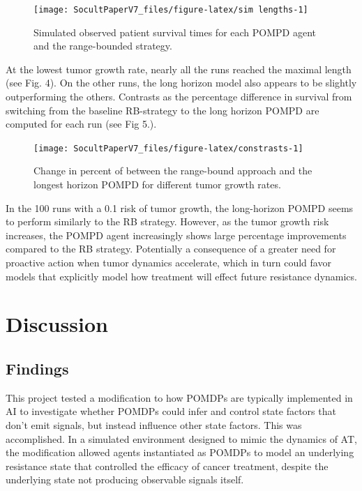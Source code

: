 \documentclass[
]{article}
\begin{document}
\begin{figure}

{\centering \texttt{[image: SocultPaperV7\_files/figure-latex/sim lengths-1]} 

}

\caption{Simulated observed patient survival times for each POMPD agent and the range-bounded strategy.}\label{fig:sim lengths}
\end{figure}

At the lowest tumor growth rate, nearly all the runs reached the maximal
length (see Fig. 4). On the other runs, the long horizon model also
appears to be slightly outperforming the others. Contrasts as the
percentage difference in survival from switching from the baseline
RB-strategy to the long horizon POMPD are computed for each run (see Fig
5.).

\begin{figure}

{\centering \texttt{[image: SocultPaperV7\_files/figure-latex/constrasts-1]} 

}

\caption{Change in percent of between the range-bound approach and the longest horizon POMPD for different tumor growth rates.}\label{fig:constrasts}
\end{figure}

In the 100 runs with a 0.1 risk of tumor growth, the long-horizon POMPD
seems to perform similarly to the RB strategy. However, as the tumor
growth risk increases, the POMPD agent increasingly shows large
percentage improvements compared to the RB strategy. Potentially a
consequence of a greater need for proactive action when tumor dynamics
accelerate, which in turn could favor models that explicitly model how
treatment will effect future resistance dynamics.

\section{Discussion}\label{discussion}

\subsection{Findings}\label{findings}

This project tested a modification to how POMDPs are typically
implemented in AI to investigate whether POMDPs could infer and control
state factors that don't emit signals, but instead influence other state
factors. This was accomplished. In a simulated environment designed to
mimic the dynamics of AT, the modification allowed agents instantiated
as POMDPs to model an underlying resistance state that controlled the
efficacy of cancer treatment, despite the underlying state not producing
observable signals itself.
\end{document}
